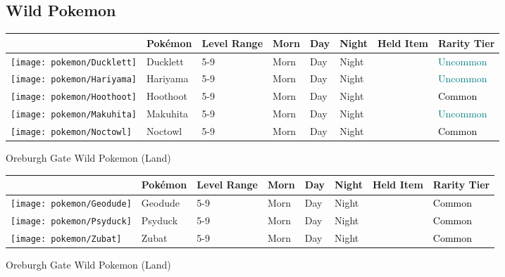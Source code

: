 \subsection{Wild Pokemon}%
\label{subsec:WildPokemon}%
\begin{longtable}{||l l l l l l l l||}%
\hline%
&Pokémon&Level Range&Morn&Day&Night&Held Item&Rarity Tier\\%
\hline%
\endhead%
\hline%
\texttt{[image: pokemon/Ducklett]}&Ducklett&5{-}9&Morn&Day&Night&&\textcolor{teal}{%
Uncommon%
}\\%
\hline%
\texttt{[image: pokemon/Hariyama]}&Hariyama&5{-}9&Morn&Day&Night&&\textcolor{teal}{%
Uncommon%
}\\%
\hline%
\texttt{[image: pokemon/Hoothoot]}&Hoothoot&5{-}9&Morn&Day&Night&&\textcolor{black}{%
Common%
}\\%
\hline%
\texttt{[image: pokemon/Makuhita]}&Makuhita&5{-}9&Morn&Day&Night&&\textcolor{teal}{%
Uncommon%
}\\%
\hline%
\texttt{[image: pokemon/Noctowl]}&Noctowl&5{-}9&Morn&Day&Night&&\textcolor{black}{%
Common%
}\\%
\hline%
\end{longtable}%
\caption{Oreburgh Gate Wild Pokemon (Land)}%
\begin{longtable}{||l l l l l l l l||}%
\hline%
&Pokémon&Level Range&Morn&Day&Night&Held Item&Rarity Tier\\%
\hline%
\endhead%
\hline%
\texttt{[image: pokemon/Geodude]}&Geodude&5{-}9&Morn&Day&Night&&\textcolor{black}{%
Common%
}\\%
\hline%
\texttt{[image: pokemon/Psyduck]}&Psyduck&5{-}9&Morn&Day&Night&&\textcolor{black}{%
Common%
}\\%
\hline%
\texttt{[image: pokemon/Zubat]}&Zubat&5{-}9&Morn&Day&Night&&\textcolor{black}{%
Common%
}\\%
\hline%
\end{longtable}%
\caption{Oreburgh Gate Wild Pokemon (Land)}%
